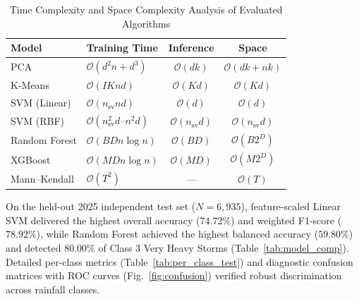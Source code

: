 \documentclass[conference]{IEEEtran}
\begin{document}
\begin{table}[!htbp]
\centering
\caption{Time Complexity and Space Complexity Analysis of Evaluated Algorithms}
\label{tab:complexity}
\vspace{3pt}
{\scriptsize
\renewcommand{\arraystretch}{1.15}\setlength{\tabcolsep}{2pt}%
\begin{tabularx}{\columnwidth}{|l|Y|c|c|}
\hline
\textbf{Model} & \textbf{Training Time} & \textbf{Inference} & \textbf{Space} \\
\hline
PCA & $\mathcal{O}(d^2 n + d^3)$ & $\mathcal{O}(d k)$ & $\mathcal{O}(d k + n k)$ \\ \hline
K-Means & $\mathcal{O}(I K n d)$ & $\mathcal{O}(K d)$ & $\mathcal{O}(K d)$ \\ \hline
SVM (Linear) & $\mathcal{O}(n_{\text{sv}} n d)$ & $\mathcal{O}(d)$ & $\mathcal{O}(d)$ \\ \hline
SVM (RBF) & $\mathcal{O}(n_{\text{sv}}^2 d \text{--} n^2 d)$ & $\mathcal{O}(n_{\text{sv}} d)$ & $\mathcal{O}(n_{\text{sv}} d)$ \\ \hline
Random Forest & $\mathcal{O}(B D n \log n)$ & $\mathcal{O}(B D)$ & $\mathcal{O}(B 2^D)$ \\ \hline
XGBoost & $\mathcal{O}(M D n \log n)$ & $\mathcal{O}(M D)$ & $\mathcal{O}(M 2^D)$ \\ \hline
Mann--Kendall & $\mathcal{O}(T^2)$ & --- & $\mathcal{O}(T)$ \\
\hline
\end{tabularx}%
}
\end{table}

On the held-out 2025 independent test set ($N = 6{,}935$), feature-scaled Linear SVM delivered the highest overall accuracy ($74.72\%$) and weighted F1-score ($78.92\%$), while Random Forest achieved the highest balanced accuracy ($59.80\%$) and detected $80.00\%$ of Class 3 Very Heavy Storms (Table~\ref{tab:model_comp}). Detailed per-class metrics (Table~\ref{tab:per_class_test}) and diagnostic confusion matrices with ROC curves (Fig.~\ref{fig:confusion}) verified robust discrimination across rainfall classes.
\end{document}
